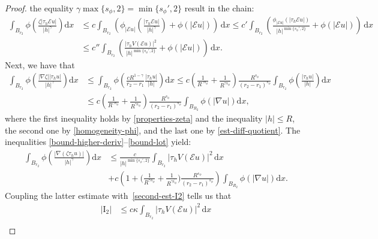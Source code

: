 \documentclass[leqno,11pt]{amsart}%
\numberwithin{equation}{section}
\def\d{\mathrm{d}}
\def\E{\mathcal{E}}
\def\dx{\d x}
\theoremstyle{definition}
\numberwithin{equation}{section}
\begin{document}
\begin{proof}
  the equality
  $\gamma\max\{s_\phi,2\}=\min\{s_\phi',2\}$ result in the chain:
  \begin{align}\label{bound-hot}
    \int_{B_{r_2}}
    \phi\left(\frac{\zeta|\tau_h\E u|}{|h|^\gamma}\right)
    \dx
    &\le
      c\int_{B_{r_2}}
      \left(
      \phi_{|\E u|}\left(\frac{|\tau_h\E u|}{|h|^\gamma}\right)
      +
      \phi(|\E u|)
      \right)\, \dx \le
      c'\int_{B_{r_2}}
      \left(
      \frac{\phi_{|\E u|}(|\tau_h\E u|)}{|h|^{\min\{s_\phi',2\}}}
      +
      \phi(|\E u|)
      \right)\, \dx\\\nonumber
    &\le
      c''\int_{B_{r_2}}
      \left(
      \frac{|\tau_hV(\E u)|^2}{|h|^{\min\{s_\phi',2\}}}
      +
      \phi(|\E u|)
      \right)\, \dx.
  \end{align}
Next,  we have that
  \begin{align}\label{bound-lot}
    \int_{B_{r_2}}
    \phi\left(\frac{|\nabla\zeta||\tau_hu|}{|h|^\gamma}\right)\dx
    &\le
      \int_{B_{r_2}}
      \phi\left(\frac{cR^{1-\gamma}}{r_2-r_1}
      \frac{|\tau_hu|}{|h|}\right)\dx\le
    {c\left(\frac{1}{R^{\gamma s_\phi}}+\frac{1}{R^{\gamma i_\phi}}\right)\frac{R^{s_\phi}}{(r_2-r_1)^{s_\phi}}}\int_{B_{r_2}}
      \phi\left(\frac{|\tau_hu|}{|h|}\right)\dx\\\nonumber
    &\le
      {c\left(\frac{1}{R^{\gamma s_\phi}}+\frac{1}{R^{\gamma i_\phi}}\right)\frac{R^{s_\phi}}{(r_2-r_1)^{s_\phi}}}\int_{B_{R_2}}
      \phi(|\nabla u|)\dx,
  \end{align}
  where the first inequality holds by \eqref{properties-zeta} and the inequality $|h|\le R$, the second one by
\eqref{homogeneity-phi}, and the last one by \eqref{est-diff-quotient}.
The inequalities \eqref{bound-higher-deriv}--\eqref{bound-lot} yield:
  \begin{align}\label{key-estimate}
    \int_{B_{r_2}}
    \phi\left(\frac{|\nabla (\zeta\tau_hu)|}{|h|^\gamma}\right) \dx
    &\le
      \frac{c}{|h|^{\min\{s_\phi',2\}}}\int_{B_{r_2}}
      |\tau_hV(\E u)|^2\, \dx
      \\\nonumber
      &+
    c\left({1}+\bigg(\frac{1}{R^{\gamma s_\phi}}+\frac{1}{R^{\gamma i_\phi}}\bigg)\frac{R^{s_\phi}}{(r_2-r_1)^{s_\phi}}\right)\int_{B_{R_2}}
      \phi(|\nabla u|)\dx.
  \end{align}
  Coupling the latter estimate with~\eqref{second-est-I2} tells us that
  \begin{align}\label{est-I2}
    |\mathrm{I}_2|
    &\le
      c\kappa\int_{B_{r_2}}
      |\tau_hV(\E u)|^2\, \dx
      \\\nonumber

\end{align}
\end{proof}
\end{document}
